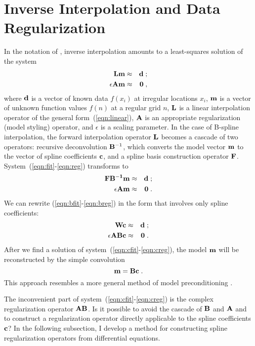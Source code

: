 \section{Inverse Interpolation and Data Regularization}

In the notation of , inverse interpolation amounts to a
least-squares solution of the system
\begin{eqnarray}
  \label{eqn:fit}
  \bold{L m} & \approx & \bold{d}\;; \\
  \label{eqn:reg}
  \epsilon \bold{A m} & \approx & \bold{0}\;, 
\end{eqnarray}
where $\bold{d}$ is a vector of known data $f(x_i)$ at irregular
locations $x_i$, $\bold{m}$ is a vector of unknown function values
$f(n)$ at a regular grid $n$, $\bold{L}$ is a linear interpolation
operator of the general form~(\ref{eqn:linear}), $\bold{A}$ is an
appropriate regularization (model styling) operator, and $\epsilon$ is
a scaling parameter. In the case of B-spline interpolation, the
forward interpolation operator $\bold{L}$ becomes a cascade of two
operators: recursive deconvolution $\bold{B}^{-1}$, which converts the
model vector $\bold{m}$ to the vector of spline coefficients
$\bold{c}$, and a spline basis construction operator $\bold{F}$.
System~(\ref{eqn:fit}-\ref{eqn:reg}) transforms to
\begin{eqnarray}
  \label{eqn:bfit}
  \bold{F B^{-1} m} & \approx & \bold{d}\;; \\
  \label{eqn:breg}
  \epsilon \bold{A m} & \approx & \bold{0}\;. 
\end{eqnarray}
We can rewrite (\ref{eqn:bfit}-\ref{eqn:breg}) in the form that
involves only spline coefficients:
\begin{eqnarray}
  \label{eqn:cfit}
  \bold{W c} & \approx & \bold{d}\;; \\
  \label{eqn:creg}
  \epsilon \bold{A B c} & \approx & \bold{0}\;. 
\end{eqnarray}
After we find a solution of system~(\ref{eqn:cfit}-\ref{eqn:creg}),
the model $\bold{m}$ will be reconstructed by the simple convolution
\begin{equation}
  \label{eqn:post}
  \bold{m = B c}\;.
\end{equation}
This approach resembles a more general method of model preconditioning
\cite{Fomel.sep.94.sergey1}.
\par
The inconvenient part of system~(\ref{eqn:cfit}-\ref{eqn:creg}) is the
complex regularization operator $\bold{A B}$. Is it possible to avoid
the cascade of $\bold{B}$ and $\bold{A}$ and to construct a
regularization operator directly applicable to the spline coefficients
$\bold{c}$? In the following subsection, I develop a method for
constructing spline regularization operators from differential
equations.

